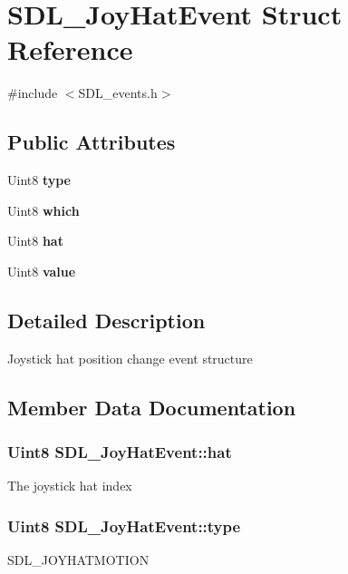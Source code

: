 \section{S\+D\+L\+\_\+\+Joy\+Hat\+Event Struct Reference}
\label{struct_s_d_l___joy_hat_event}


{\ttfamily \#include $<$S\+D\+L\+\_\+events.\+h$>$}

\subsection*{Public Attributes}
\begin{DoxyCompactItemize}
\item 
Uint8 {\bf type}
\item 
Uint8 {\bf which}
\item 
Uint8 {\bf hat}
\item 
Uint8 {\bf value}
\end{DoxyCompactItemize}


\subsection{Detailed Description}
Joystick hat position change event structure 

\subsection{Member Data Documentation}
\subsubsection[{hat}]{\setlength{\rightskip}{0pt plus 5cm}Uint8 S\+D\+L\+\_\+\+Joy\+Hat\+Event\+::hat}\label{struct_s_d_l___joy_hat_event_ab1b54a6d1091e583e856f86b5af1e2f6}
The joystick hat index 
\subsubsection[{type}]{\setlength{\rightskip}{0pt plus 5cm}Uint8 S\+D\+L\+\_\+\+Joy\+Hat\+Event\+::type}\label{struct_s_d_l___joy_hat_event_a1592071b54de4fe74c087945f43a1d3f}
S\+D\+L\+\_\+\+J\+O\+Y\+H\+A\+T\+M\+O\+T\+I\+O\+N 
